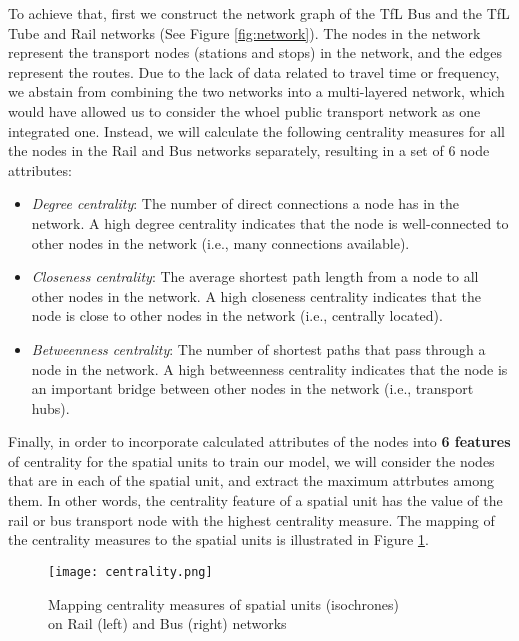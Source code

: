 To achieve that, first we construct the network graph of the TfL Bus and the TfL Tube and Rail networks (See Figure \ref{fig:network}). The nodes in the network represent the transport nodes (stations and stops) in the network, and the edges represent the routes. Due to the lack of data related to travel time or frequency, we abstain from combining the two networks into a multi-layered network, which would have allowed us to consider the whoel public transport network as one integrated one. Instead, we will calculate the following centrality measures for all the nodes in the Rail and Bus networks separately, resulting in a set of 6 node attributes:

\begin{itemize}
    \setlength\itemsep{0em}
    \item \textit{Degree centrality}: The number of direct connections a node has in the network. A high degree centrality indicates that the node is well-connected to other nodes in the network (i.e., many connections available).
    \item \textit{Closeness centrality}: The average shortest path length from a node to all other nodes in the network. A high closeness centrality indicates that the node is close to other nodes in the network (i.e., centrally located). 
    \item \textit{Betweenness centrality}: The number of shortest paths that pass through a node in the network. A high betweenness centrality indicates that the node is an important bridge between other nodes in the network (i.e., transport hubs).
\end{itemize}

Finally, in order to incorporate calculated attributes of the nodes into \textbf{6 features} of centrality for the spatial units to train our model, we will consider the nodes that are in each of the spatial unit, and extract the maximum attrbutes among them. In other words, the centrality feature of a spatial unit has the value of the rail or bus transport node with the highest centrality measure. The mapping of the centrality measures to the spatial units is illustrated in Figure \ref{fig:centrality}.

\begin{figure}[!ht]
    \centering
    \texttt{[image: centrality.png]}
    \captionsetup{justification=centering}
    \caption{Mapping centrality measures of spatial units (isochrones)\\on Rail (left) and Bus (right) networks}
    \label{fig:centrality}
\end{figure}

